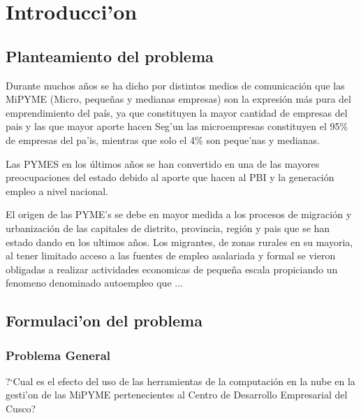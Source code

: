 %
%

\chapter{Introducci'on}

\section{Planteamiento del problema}
Durante muchos a\~nos se ha dicho por distintos medios de comunicaci\'on que
las MiPYME (Micro, peque\~nas y medianas empresas) son la expresi\'on m\'as pura
del emprendimiento del pa\'is, ya que constituyen la mayor cantidad de empresas
del pais y las que mayor aporte hacen
Seg'un \citep{produce} las microempresas constituyen el 95\% de empresas del
pa'is, mientras que solo el 4\% son peque'nas y medianas.

Las PYMES en los \'ultimos a\~nos se han convertido en una de las mayores
preocupaciones del estado debido al aporte que hacen al PBI y la
generaci\'on empleo a nivel nacional.

El origen de las PYME's se debe en mayor medida a los procesos de
migraci\'on y urbanizaci\'on de las capitales de distrito, provincia,
regi\'on y pais que se han estado dando en los ultimos a\~nos. Los
migrantes, de zonas rurales en su mayoria, al tener limitado acceso
a las fuentes de empleo asalariada y formal se vieron obligadas a
realizar actividades economicas de peque\~na escala propiciando un
fenomeno denominado autoempleo que ...
\section{Formulaci'on del problema}
\subsection{Problema General}
?`Cual es el efecto del uso de las herramientas de la computaci\'on en la nube
en la gesti'on de las MiPYME pertenecientes al Centro de Desarrollo Empresarial
del Cusco?
